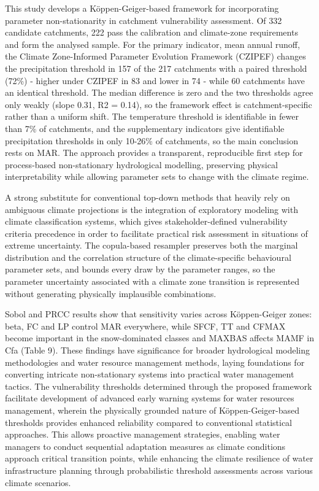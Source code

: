 \documentclass[
]{article}
\begin{document}
This study develops a Köppen-Geiger-based framework for incorporating
parameter non-stationarity in catchment vulnerability assessment. Of 332
candidate catchments, 222 pass the calibration and climate-zone
requirements and form the analysed sample. For the primary indicator,
mean annual runoff, the Climate Zone-Informed Parameter Evolution
Framework (CZIPEF) changes the precipitation threshold in 157 of the 217
catchments with a paired threshold (72\%) - higher under CZIPEF in 83
and lower in 74 - while 60 catchments have an identical threshold. The
median difference is zero and the two thresholds agree only weakly
(slope 0.31, R2 = 0.14), so the framework effect is catchment-specific
rather than a uniform shift. The temperature threshold is identifiable
in fewer than 7\% of catchments, and the supplementary indicators give
identifiable precipitation thresholds in only 10-26\% of catchments, so
the main conclusion rests on MAR. The approach provides a transparent,
reproducible first step for process-based non-stationary hydrological
modelling, preserving physical interpretability while allowing parameter
sets to change with the climate regime.

A strong substitute for conventional top-down methods that heavily rely
on ambiguous climate projections is the integration of exploratory
modeling with climate classification systems, which gives
stakeholder-defined vulnerability criteria precedence in order to
facilitate practical risk assessment in situations of extreme
uncertainty. The copula-based resampler preserves both the marginal
distribution and the correlation structure of the climate-specific
behavioural parameter sets, and bounds every draw by the parameter
ranges, so the parameter uncertainty associated with a climate zone
transition is represented without generating physically implausible
combinations.

Sobol and PRCC results show that sensitivity varies across Köppen-Geiger
zones: beta, FC and LP control MAR everywhere, while SFCF, TT and CFMAX
become important in the snow-dominated classes and MAXBAS affects MAMF
in Cfa (Table 9). These findings have significance for broader
hydrological modeling methodologies and water resource management
methods, laying foundations for converting intricate non-stationary
systems into practical water management tactics. The vulnerability
thresholds determined through the proposed framework facilitate
development of advanced early warning systems for water resources
management, wherein the physically grounded nature of
Köppen-Geiger-based thresholds provides enhanced reliability compared to
conventional statistical approaches. This allows proactive management
strategies, enabling water managers to conduct sequential adaptation
measures as climate conditions approach critical transition points,
while enhancing the climate resilience of water infrastructure planning
through probabilistic threshold assessments across various climate
scenarios.
\end{document}
